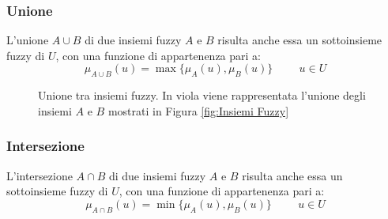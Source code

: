 \documentclass[a4paper,12pt]{report}
\begin{document}
\subsubsection{Unione}
L'unione $A \cup B$ di due insiemi fuzzy $A$ e $B$ risulta anche essa un sottoinsieme fuzzy di $U$, con una funzione di appartenenza pari a:
\begin{equation*}
    \mu_{A\cup B} (u) = \max\{\mu_A(u),\mu_B(u)\} \hspace{1cm}  u\in U
\end{equation*}

\begin{figure}[h]
    \centering
    \caption{Unione tra insiemi fuzzy. In viola viene rappresentata l'unione degli insiemi $A$ e $B$ mostrati in Figura \ref{fig:Insiemi Fuzzy}}
    \label{fig:Unione_Insiemi_Fuzzy}   

\end{figure}

\subsubsection{Intersezione}
L'intersezione $A \cap B$ di due insiemi fuzzy $A$ e $B$ risulta anche essa un sottoinsieme fuzzy di $U$, con una funzione di appartenenza pari a:
\begin{equation*}
    \mu_{A \cap B} (u) = \min\{\mu_A(u),\mu_B(u)\} \hspace{1cm}  u\in U
\end{equation*}
\end{document}
